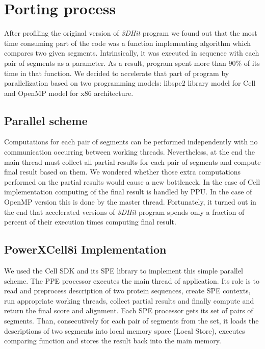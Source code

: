 \documentclass[envcountsame,envcountchap]{svmono}
\newcommand{\prog}{\emph{3DHit}}
\begin{document}
\section{Porting process}
After profiling the original version of \prog{} program we found out that
the most time consuming part of the code was a function implementing algorithm
which compares two given segments.
Intrinsically, it was executed in sequence with each pair of segments as a
parameter.
As a result, program spent more than $90\%$ of its time in that function.
We decided to accelerate that part of program by parallelization based on two
programming models: libspe2 library model for Cell and OpenMP model for x86
architecture.

\subsection{Parallel scheme}
Computations for each pair of segments can be performed independently with
no communication occurring between working threads.
Nevertheless, at the end the main thread must collect all partial results for
each pair of segments and compute final result based on them.
We wondered whether those extra computations performed on the partial results
would cause a new bottleneck.
In the case of Cell implementation computing of the final result
is handled by PPU.
In the case of OpenMP version this is done by the master thread.
Fortunately, it turned out in the end that accelerated versions of \prog{}
program spends only a fraction of percent of their execution times computing
final result.

\subsection{PowerXCell8i Implementation}
We used the Cell SDK and its SPE library to implement this simple parallel
scheme.
The PPE processor executes the main thread of application.
Its role is to read and preprocess description of two protein sequences, create
SPE contexts, run appropriate working threads, collect partial results and
finally compute and return the final score and alignment.
Each SPE processor gets its set of pairs of segments.
Than, consecutively for each pair of segments from the set, it loads the
descriptions of two segments into local memory space (Local Store),
executes comparing function and stores the result back into the main memory.
\end{document}

